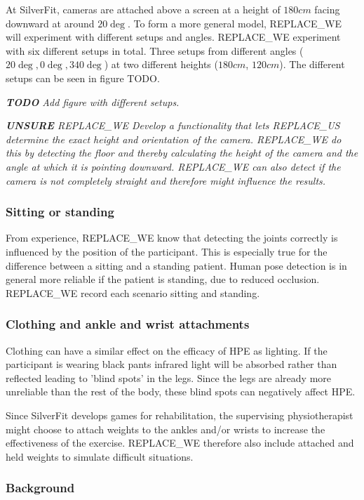 At SilverFit, cameras are attached above a screen at a height of $180 cm$ facing downward at around $20\deg$. To form a more general model, REPLACE_WE will experiment with different setups and angles. REPLACE_WE experiment with six different setups in total. Three setups from different angles ($20\deg, 0\deg, 340\deg$) at two different heights ($180cm$, $120cm$). The different setups can be seen in figure TODO.

\textit{\textbf{TODO} Add figure with different setups.}

\textit{
  \textbf{UNSURE} REPLACE_WE Develop a functionality that lets REPLACE_US determine the exact height and orientation of the camera. REPLACE_WE do this by detecting the floor and thereby calculating the height of the camera and the angle at which it is pointing downward. REPLACE_WE can also detect if the camera is not completely straight and therefore might influence the results.
}

\subsubsection{Sitting or standing}

From experience, REPLACE_WE know that detecting the joints correctly is influenced by the position of the participant. This is especially true for the difference between a sitting and a standing patient. Human pose detection is in general more reliable if the patient is standing, due to reduced occlusion. REPLACE_WE record each scenario sitting and standing.

\subsubsection{Clothing and ankle and wrist attachments}

Clothing can have a similar effect on the efficacy of HPE as lighting. If the participant is wearing black pants infrared light will be absorbed rather than reflected leading to 'blind spots' in the legs. Since the legs are already more unreliable than the rest of the body, these blind spots can negatively affect HPE. 

Since SilverFit develops games for rehabilitation, the supervising physiotherapist might choose to attach weights to the ankles and/or wrists to increase the effectiveness of the exercise. REPLACE_WE therefore also include attached and held weights to simulate difficult situations.

\subsubsection{Background}

